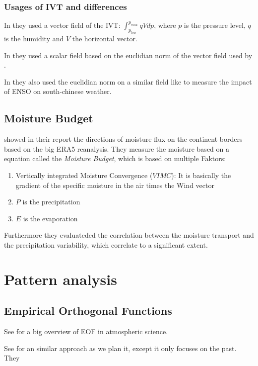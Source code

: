 \subsubsection{Usages of IVT and differences}

In \cite{ralph2017dropsonde} they used a vector field of the IVT: $\int_{p_{low}}^{p_{max}} qV dp$, where $p$ is the pressure level, $q$ is the humidity and $V$ the horizontal vector.

In \cite{sousa2020north} they used a scalar field based on the euclidian norm of the vector field used by \cite{ralph2017dropsonde}.


In \cite{Ayantobo2021IntegratedMT} they also used the euclidian norm on a similar field like \cite{ralph2017dropsonde} to measure the impact of  ENSO on south-chinese weather.

\subsection{Moisture Budget}

\citeauthor{atmos13101694} showed in their report \cite{atmos13101694} the directions of moisture flux on the continent borders based on the big ERA5 reanalysis.
They measure the moisture based on a equation called the \textit{Moisture Budget}, which is based on multiple Faktors: 

\begin{enumerate}
  \item Vertically integrated Moisture Convergence ($VIMC$): It is basically the gradient of the specific moisture in the air times the Wind vector
  \item $P$ is the precipitation 
  \item $E$ is the evaporation
\end{enumerate}

Furthermore they evaluateded the correlation between the moisture transport and the precipitation variability, which correlate to a significant extent.

\section{Pattern analysis}

\subsection{Empirical Orthogonal Functions}

See \cite{hannachi2007eof_review} for a big overview of EOF in atmospheric science.

See \cite{Ayantobo2021IntegratedMT} for an similar approach as we plan it, except it only focuses on the past.
They 
